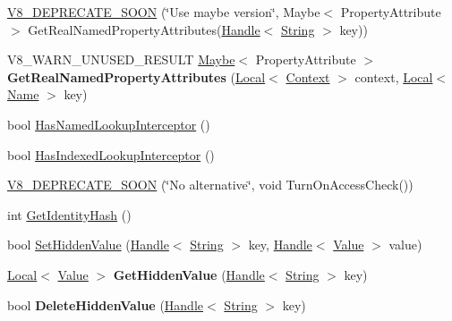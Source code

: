 \begin{DoxyCompactItemize}
\item 
\hyperlink{classv8_1_1_object_ac62e284ce1b79d0e9bec2175c752b365}{V8\+\_\+\+D\+E\+P\+R\+E\+C\+A\+T\+E\+\_\+\+S\+O\+O\+N} (\char`\"{}Use maybe version\char`\"{}, Maybe$<$ Property\+Attribute $>$ Get\+Real\+Named\+Property\+Attributes(\hyperlink{classv8_1_1_local}{Handle}$<$ \hyperlink{classv8_1_1_string}{String} $>$ key))
\item 
\hypertarget{classv8_1_1_object_a476c21f05ffc519252fad0ab46de33d7}{}V8\+\_\+\+W\+A\+R\+N\+\_\+\+U\+N\+U\+S\+E\+D\+\_\+\+R\+E\+S\+U\+L\+T \hyperlink{classv8_1_1_maybe}{Maybe}$<$ Property\+Attribute $>$ {\bfseries Get\+Real\+Named\+Property\+Attributes} (\hyperlink{classv8_1_1_local}{Local}$<$ \hyperlink{classv8_1_1_context}{Context} $>$ context, \hyperlink{classv8_1_1_local}{Local}$<$ \hyperlink{classv8_1_1_name}{Name} $>$ key)\label{classv8_1_1_object_a476c21f05ffc519252fad0ab46de33d7}

\item 
bool \hyperlink{classv8_1_1_object_a1e96fcb9ee17101c0299ec68f2cf8610}{Has\+Named\+Lookup\+Interceptor} ()
\item 
bool \hyperlink{classv8_1_1_object_a278913bcd203434870ce5184a538a9af}{Has\+Indexed\+Lookup\+Interceptor} ()
\item 
\hyperlink{classv8_1_1_object_a0d22b0e953669966163f09a0d8bd1ca9}{V8\+\_\+\+D\+E\+P\+R\+E\+C\+A\+T\+E\+\_\+\+S\+O\+O\+N} (\char`\"{}No alternative\char`\"{}, void Turn\+On\+Access\+Check())
\item 
int \hyperlink{classv8_1_1_object_ac1ece41e81a499920ec3a2a3471653bc}{Get\+Identity\+Hash} ()
\item 
bool \hyperlink{classv8_1_1_object_a2200482b09feb914dc91d8256671f7f0}{Set\+Hidden\+Value} (\hyperlink{classv8_1_1_local}{Handle}$<$ \hyperlink{classv8_1_1_string}{String} $>$ key, \hyperlink{classv8_1_1_local}{Handle}$<$ \hyperlink{classv8_1_1_value}{Value} $>$ value)
\item 
\hypertarget{classv8_1_1_object_a0fb148558e1749b04a2e13b2c9fa4441}{}\hyperlink{classv8_1_1_local}{Local}$<$ \hyperlink{classv8_1_1_value}{Value} $>$ {\bfseries Get\+Hidden\+Value} (\hyperlink{classv8_1_1_local}{Handle}$<$ \hyperlink{classv8_1_1_string}{String} $>$ key)\label{classv8_1_1_object_a0fb148558e1749b04a2e13b2c9fa4441}

\item 
\hypertarget{classv8_1_1_object_ab1d274da1949b1f68087728760ee4172}{}bool {\bfseries Delete\+Hidden\+Value} (\hyperlink{classv8_1_1_local}{Handle}$<$ \hyperlink{classv8_1_1_string}{String} $>$ key)\label{classv8_1_1_object_ab1d274da1949b1f68087728760ee4172}


\end{DoxyCompactItemize}
